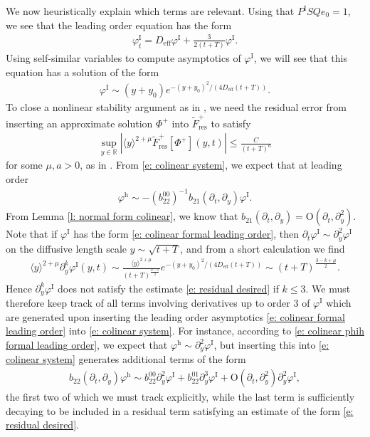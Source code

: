 \documentclass[11pt]{article}
\newcommand{\R}{\mathbb{R}}
\renewcommand{\phi}{\varphi}
\numberwithin{equation}{section}
\numberwithin{prop}{section}
\newcommand{\phih}{\phi^\mathrm{h}}
\newcommand{\Deff}{D_\mathrm{eff}}
\newcommand{\phiI}{\phi^\mathrm{I}}
\begin{document}
We now heuristically explain which terms are relevant. Using that $P^\mathrm{I} SQ e_0 = 1$, we see that the leading order equation has the form
\begin{align*}
\phiI_t = \Deff \phiI + \frac{3}{2(t+T)} \phiI.
\end{align*}
Using self-similar variables to compute asymptotics of $\phiI$, we will see that this equation has a solution of the form
\begin{align}
\phiI \sim (y+y_0) e^{-(y+y_0)^2/(4 \Deff (t+T))}. \label{e: colinear formal leading order}
\end{align}
To close a nonlinear stability argument as in \cite{CAMS}, we need the residual error from inserting an approximate solution $\Phi^+$ into $\tilde{F}_\mathrm{res}^+$ to satisfy
\begin{align}
\sup_{y \in \R} \left| \langle y \rangle^{2 + \mu} \tilde{F}_\mathrm{res}^+ [\Phi^+] (y,t) \right| \leq \frac{C}{(t+T)^a} \label{e: residual desired}
\end{align}
for some $\mu, a > 0$, as in \cite[Lemma 2.4]{CAMS}. From \eqref{e: colinear system}, we expect that at leading order 
\begin{align}
\phih \sim -(b_{22}^{00})^{-1} b_{21} (\partial_t, \partial_y) \phiI. \label{e: colinear phih formal leading order}
\end{align}
From Lemma \ref{l: normal form colinear}, we know that $b_{21}(\partial_t, \partial_y) = \mathrm{O}(\partial_t, \partial_y^2)$. Note that if $\phiI$ has the form \eqref{e: colinear formal leading order}, then $\partial_t \phiI \sim \partial_y^2 \phiI$ on the diffusive length scale $y \sim \sqrt{t+T}$, and from a short calculation we find
\begin{align}
\langle y \rangle^{2 + \mu} \partial_y^k \phiI (y,t) \sim \frac{\langle y \rangle^{2 + \mu}}{(t+T)^\frac{k-1}{2}} e^{-(y+y_0)^2/(4 \Deff (t+T))} \sim (t+T)^\frac{3-k+\mu}{2}. 
\end{align}
Hence $\partial_y^k \phiI$ does not satisfy the estimate \eqref{e: residual desired} if $k \leq 3$. We must therefore keep track of all terms involving derivatives up to order 3 of $\phiI$  which are generated upon inserting the leading order asymptotics \eqref{e: colinear formal leading order} into \eqref{e: colinear system}. For instance, according to \eqref{e: colinear phih formal leading order}, we expect that $\phih \sim \partial_y^2 \phiI$, but inserting this into \eqref{e: colinear system} generates  additional terms of the form
\begin{align}
b_{22}(\partial_t, \partial_y) \phih \sim b_{22}^{00} \partial_y^2 \phiI + b_{22}^{01} \partial_y^3 \phiI + \mathrm{O}(\partial_t, \partial_y^2) \partial_y^2 \phiI,
\end{align}
the first two of which we must track explicitly, while the last term is sufficiently decaying to be included in a residual term satisfying an estimate of the form \eqref{e: residual desired}. 
\end{document}

